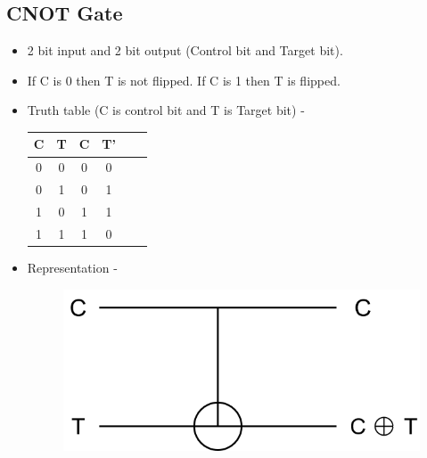 \documentclass[11.5pt, paper=a4]{article}
\theoremstyle{definition}
\numberwithin{theorem}{section}
\begin{document}
\subsection{CNOT Gate}
    \begin{itemize}
        \item 2 bit input and 2 bit output (Control bit and Target bit).
        \item If C is 0 then T is not flipped. If C is 1 then T is flipped.
        \item Truth table (C is control bit and T is Target bit) -
            \begin{center}
            \begin{tabular}{ |c|c|c|c|c|c| }
            \hline
            C & T & C & T'\\
            \hline
            0 & 0 & 0 & 0\\
            0 & 1 & 0 & 1\\
            1 & 0 & 1 & 1\\
            1 & 1 & 1 & 0\\
            \hline
            \end{tabular}
            \end{center}
        \item Representation -
        \begin{figure}[h]
            \centering
            \includegraphics[scale=0.3]{CNOTgate.png}
        \end{figure}
    \end{itemize}
\end{document}
